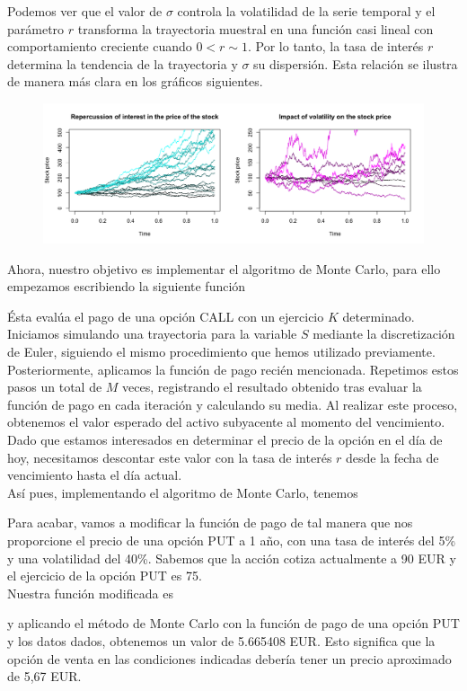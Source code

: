 \documentclass[a4paper,]{article}
\begin{document}
Podemos ver que el valor de $\sigma$ controla la volatilidad de la serie temporal y el parámetro $r$ transforma la trayectoria muestral en una función casi lineal con comportamiento creciente cuando $0 < r \sim 1$. Por lo tanto, la tasa de interés $r$ determina la tendencia de la trayectoria y $\sigma $ su dispersión. Esta relación se ilustra de manera más clara en los gráficos siguientes.
\begin{figure}[H]
    \centering
    \includegraphics[width=1\linewidth]{plot5.png}
\end{figure}


Ahora, nuestro objetivo es implementar el algoritmo de Monte Carlo, para ello empezamos escribiendo la siguiente función \\
\vspace{1cm}

Ésta evalúa el pago de una opción CALL con un ejercicio $K$ determinado.\\

Iniciamos simulando una trayectoria para la variable $S$ mediante la discretización de Euler, siguiendo el mismo procedimiento que hemos utilizado previamente. Posteriormente, aplicamos la función de pago recién mencionada. Repetimos estos pasos un total de $M$ veces, registrando el resultado obtenido tras evaluar la función de pago en cada iteración y calculando su media. Al realizar este proceso, obtenemos el valor esperado del activo subyacente al momento del vencimiento. Dado que estamos interesados en determinar el precio de la opción en el día de hoy, necesitamos descontar este valor con la tasa de interés $r$ desde la fecha de vencimiento hasta el día actual. \\

Así pues, implementando el algoritmo de Monte Carlo, tenemos
\vspace{1cm}

Para acabar, vamos a modificar la función de pago de tal manera que nos proporcione el precio de una opción PUT a 1 año, con una tasa de interés del 5\% y una volatilidad del 40\%. Sabemos que la acción cotiza actualmente a 90 EUR y el ejercicio de la opción PUT es 75. \\

Nuestra función modificada es
\vspace{1cm}

y aplicando el método de Monte Carlo con la función de pago de una opción PUT y los datos dados, obtenemos un valor de 5.665408 EUR. Esto significa que la opción de venta en las condiciones indicadas debería tener un precio aproximado de 5,67 EUR. 
\end{document}
